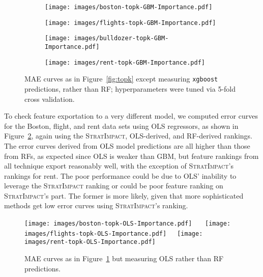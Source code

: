 \documentclass[smallextended]{svjour3}       %
\newcommand{\figref}[1]{Figure~\ref{#1}}
\newcommand{\simp}{\fontfamily{cmr}\textsc{\small StratImpact}}
\begin{document}
\begin{figure}
\centering
\begin{subfigure}{.245\textwidth}
    \centering
\texttt{[image: images/boston-topk-GBM-Importance.pdf]}
\vspace{-5mm}
\subcaption{}
\end{subfigure}%
\hfill
\begin{subfigure}{.245\textwidth}
    \centering
\texttt{[image: images/flights-topk-GBM-Importance.pdf]}
\vspace{-5mm}
\subcaption{}
\end{subfigure}
\hfill
\begin{subfigure}{.245\textwidth}
    \centering
\texttt{[image: images/bulldozer-topk-GBM-Importance.pdf]}
\vspace{-5mm}
\subcaption{}
\end{subfigure}%
\hfill
\begin{subfigure}{.245\textwidth}
    \centering
\texttt{[image: images/rent-topk-GBM-Importance.pdf]}
\vspace{-5mm}
\subcaption{}
\end{subfigure}
\vspace{-3mm}
\caption[short]{\small MAE curves as in \figref{fig:topk} except measuring {\tt xgboost} predictions, rather than RF; hyperparameters were tuned via 5-fold cross validation.}
\label{fig:topk-gbm}
\end{figure}

To check feature exportation to a very different model, we computed error curves for the Boston, flight, and rent data sets using OLS regressors, as shown in \figref{fig:OLS}, again using the \simp, OLS-derived, and RF-derived rankings.  The error curves derived from OLS model predictions are all higher than those from RFs, as expected since OLS is weaker than GBM, but feature rankings from all technique export reasonably well, with the exception of \simp's rankings for rent.  The poor performance could be due to OLS' inability to leverage the \simp{} ranking or could be poor feature ranking on \simp's part.  The former is more likely, given that more sophisticated methods get low error curves using \simp's ranking.

\begin{figure}[htbp]
\begin{center}
\texttt{[image: images/boston-topk-OLS-Importance.pdf]}~~~
\texttt{[image: images/flights-topk-OLS-Importance.pdf]}~~~\texttt{[image: images/rent-topk-OLS-Importance.pdf]}
\vspace{-3mm}
\caption{\small MAE curves as in \figref{fig:topk-gbm} but measuring OLS rather than RF predictions.}
\label{fig:OLS}
\end{center}
\end{figure}
\end{document}
